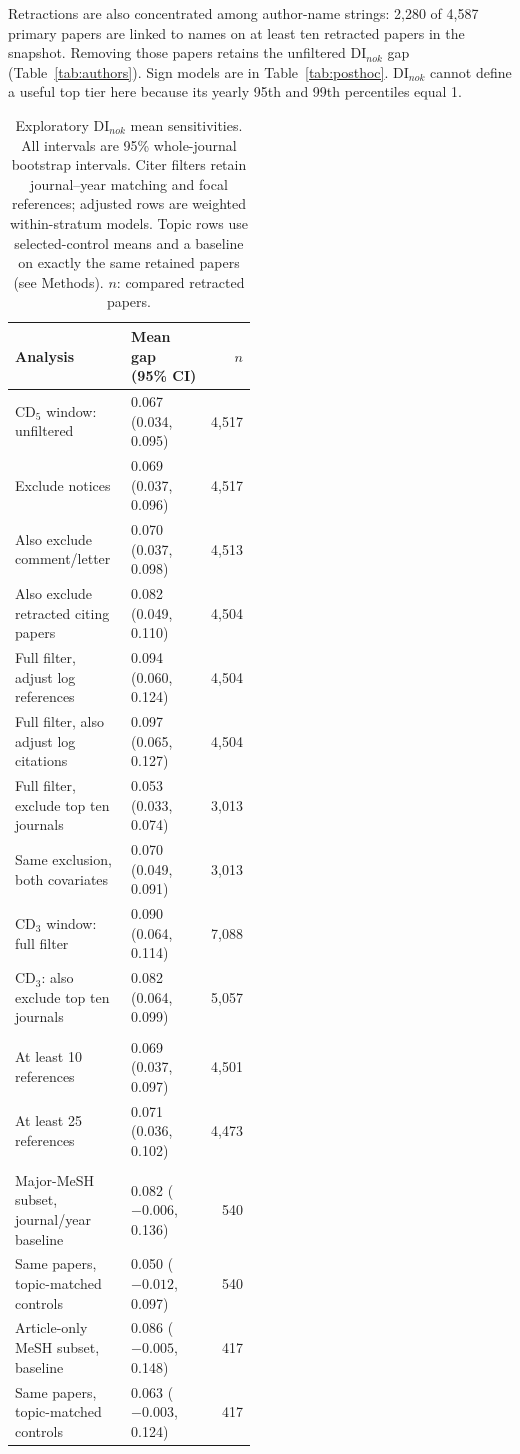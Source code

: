 Retractions are also concentrated among author-name strings: 2,280 of 4,587 primary papers are linked to names
on at least ten retracted papers in the snapshot. Removing those papers retains the unfiltered DI$_{nok}$ gap
(Table~\ref{tab:authors}).
Sign models are in Table~\ref{tab:posthoc}.
DI$_{nok}$ cannot define a useful top tier here because its yearly 95th and 99th percentiles equal 1.

\begin{table}[!htbp]
\centering
\caption{Exploratory DI$_{nok}$ mean sensitivities. All intervals are 95\% whole-journal bootstrap intervals.
Citer filters retain journal--year matching and focal references; adjusted rows are weighted within-stratum models.
Topic rows use selected-control means and a baseline on exactly the same retained papers (see Methods).
$n$: compared retracted papers.}
\label{tab:citers}
\small
\begin{tabular}{@{}>{\raggedright\arraybackslash}p{0.48\linewidth}lr@{}}
\toprule
Analysis & Mean gap (95\% CI) & $n$ \\
\midrule
CD$_5$ window: unfiltered & 0.067 (0.034, 0.095) & 4,517 \\
Exclude notices & 0.069 (0.037, 0.096) & 4,517 \\
Also exclude comment/letter & 0.070 (0.037, 0.098) & 4,513 \\
Also exclude retracted citing papers & 0.082 (0.049, 0.110) & 4,504 \\
Full filter, adjust log references & 0.094 (0.060, 0.124) & 4,504 \\
Full filter, also adjust log citations & 0.097 (0.065, 0.127) & 4,504 \\
Full filter, exclude top ten journals & 0.053 (0.033, 0.074) & 3,013 \\
Same exclusion, both covariates & 0.070 (0.049, 0.091) & 3,013 \\
CD$_3$ window: full filter & 0.090 (0.064, 0.114) & 7,088 \\
CD$_3$: also exclude top ten journals & 0.082 (0.064, 0.099) & 5,057 \\
\midrule
\multicolumn{3}{l}{Five-year unfiltered scores: citers' references in the graph} \\
At least 10 references & 0.069 (0.037, 0.097) & 4,501 \\
At least 25 references & 0.071 (0.036, 0.102) & 4,473 \\
\midrule
\multicolumn{3}{l}{Five-year unfiltered scores: topic matching} \\
Major-MeSH subset, journal/year baseline & 0.082 ($-0.006$, 0.136) & 540 \\
Same papers, topic-matched controls & 0.050 ($-0.012$, 0.097) & 540 \\
Article-only MeSH subset, baseline & 0.086 ($-0.005$, 0.148) & 417 \\
Same papers, topic-matched controls & 0.063 ($-0.003$, 0.124) & 417 \\
\bottomrule
\end{tabular}
\end{table}

